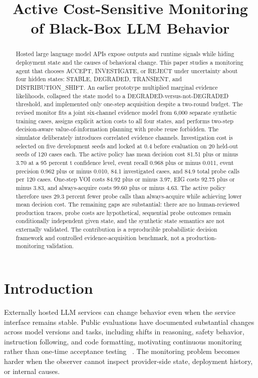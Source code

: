 \documentclass{article}
\title{Active Cost-Sensitive Monitoring of Black-Box LLM Behavior}
\author{}
\begin{document}
\maketitle
\begin{abstract}
Hosted large language model APIs expose outputs and runtime signals while hiding deployment state and the causes of behavioral change. This paper studies a monitoring agent that chooses ACCEPT, INVESTIGATE, or REJECT under uncertainty about four hidden states: STABLE, DEGRADED, TRANSIENT, and DISTRIBUTION\_SHIFT. An earlier prototype multiplied marginal evidence likelihoods, collapsed the state model to a DEGRADED-versus-not-DEGRADED threshold, and implemented only one-step acquisition despite a two-round budget. The revised monitor fits a joint six-channel evidence model from 6,000 separate synthetic training cases, assigns explicit action costs to all four states, and performs two-step decision-aware value-of-information planning with probe reuse forbidden. The simulator deliberately introduces correlated evidence channels. Investigation cost is selected on five development seeds and locked at 0.4 before evaluation on 20 held-out seeds of 120 cases each. The active policy has mean decision cost 81.51 plus or minus 3.70 at a 95 percent t confidence level, event recall 0.968 plus or minus 0.011, event precision 0.962 plus or minus 0.010, 84.1 investigated cases, and 84.9 total probe calls per 120 cases. One-step VOI costs 84.92 plus or minus 3.97, EIG costs 92.75 plus or minus 3.83, and always-acquire costs 99.60 plus or minus 4.63. The active policy therefore uses 29.3 percent fewer probe calls than always-acquire while achieving lower mean decision cost. The remaining gaps are substantial: there are no human-reviewed production traces, probe costs are hypothetical, sequential probe outcomes remain conditionally independent given state, and the synthetic state semantics are not externally validated. The contribution is a reproducible probabilistic decision framework and controlled evidence-acquisition benchmark, not a production-monitoring validation.
\end{abstract}
\section{Introduction}

Externally hosted LLM services can change behavior even when the service interface remains stable. Public evaluations have documented substantial changes across model versions and tasks, including shifts in reasoning, safety behavior, instruction following, and code formatting, motivating continuous monitoring rather than one-time acceptance testing ~. The monitoring problem becomes harder when the observer cannot inspect provider-side state, deployment history, or internal causes.
\end{document}
